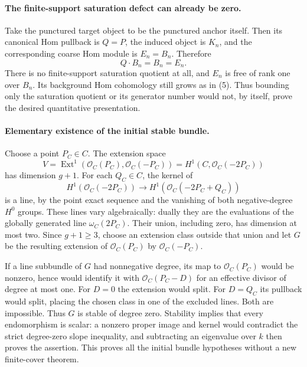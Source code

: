 \paragraph{The finite-support saturation defect can already be zero.}
Take the punctured target object to be the punctured anchor
itself. Then its canonical Hom pullback is $Q=P$, the induced
object is $K_n$, and the corresponding coarse Hom module is
$E_n=B_n$. Therefore
\[
                   Q\cdot B_n=B_n=E_n.

\]
There is no finite-support saturation quotient at all, and
$E_n$ is free of rank one over $B_n$. Its background Hom
cohomology still grows as in (5). Thus bounding only the
saturation quotient or its generator number would not,
by itself, prove the desired quantitative presentation.

\paragraph{Elementary existence of the initial stable bundle.}
Choose a point $P_C\in C$. The extension space
\[
 V=\operatorname{Ext}^1(\mathcal O_C(P_C),
                         \mathcal O_C(-P_C))
   =H^1(C,\mathcal O_C(-2P_C))

\]
has dimension $g+1$. For each $Q_C\in C$, the kernel of
\[
 H^1(\mathcal O_C(-2P_C))\longrightarrow
 H^1(\mathcal O_C(-2P_C+Q_C))

\]
is a line, by the point exact sequence and the vanishing
of both negative-degree $H^0$ groups. These lines vary
algebraically: dually they are the evaluations of the
globally generated line $\omega_C(2P_C)$. Their union,
including zero, has dimension at most two. Since $g+1\ge3$,
choose an extension class outside that union and let $G$
be the resulting extension of $\mathcal O_C(P_C)$ by
$\mathcal O_C(-P_C)$.

If a line subbundle of $G$ had nonnegative degree, its
map to $\mathcal O_C(P_C)$ would be nonzero, hence would
identify it with $\mathcal O_C(P_C-D)$ for an effective
divisor of degree at most one. For $D=0$ the extension
would split. For $D=Q_C$ its pullback would split, placing
the chosen class in one of the excluded lines. Both are
impossible. Thus $G$ is stable of degree zero. Stability
implies that every endomorphism is scalar: a nonzero proper
image and kernel would contradict the strict degree-zero
slope inequality, and subtracting an eigenvalue over $k$
then proves the assertion. This proves all the initial
bundle hypotheses without a new finite-cover theorem.

